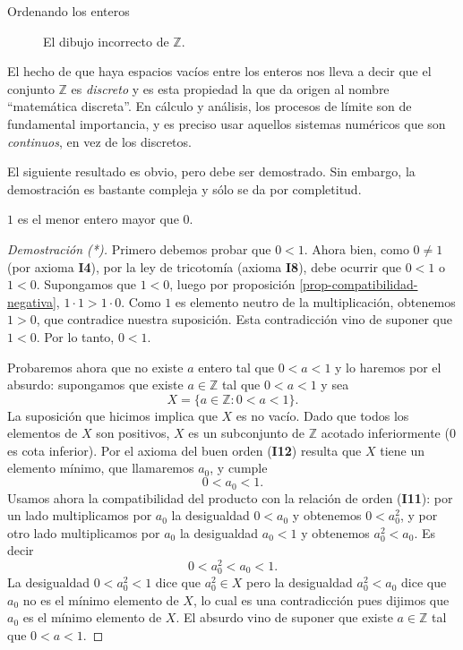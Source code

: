 \begin{section}{Ordenando los enteros}
\begin{figure}[ht]    
    \begin{center}
    \end{center}
    \caption{El dibujo incorrecto de $\mathbb Z$.}\label{f1.3}
\end{figure}

El hecho de que haya espacios vacíos entre los enteros nos lleva a decir que el conjunto $\mathbb Z$ es \textit{discreto} y es esta propiedad la que da origen al nombre ``matemática discreta''. En cálculo y análisis, los procesos de límite son de fundamental importancia, y es preciso usar aquellos sistemas numéricos que son \textit{continuos}, en vez de los discretos.

El siguiente resultado es obvio, pero  debe ser demostrado. Sin embargo,  la demostración es bastante compleja y sólo se da por completitud. 
\begin{proposicion}\label{prop-0-menor-que-1}
$1$ es el menor entero mayor que $0$.
\end{proposicion}
\begin{proof}[Demostración (*)] Primero debemos probar que $0 < 1$. Ahora bien, como $0 \not= 1$ (por axioma \textbf{I4}), por la ley de tricotomía (axioma \textbf{I8}), debe ocurrir que $0 < 1$ o $ 1 < 0$. Supongamos que $1 < 0$, luego por proposición \ref{prop-compatibilidad-negativa}, $1 \cdot 1 > 1 \cdot 0$. Como $1$  es elemento neutro de la multiplicación, obtenemos $1 > 0$, que contradice nuestra suposición. Esta contradicción vino de suponer que $1 < 0$. Por lo tanto, $0 < 1$.

Probaremos ahora que no existe $a$ entero tal que $ 0<a<1$ y lo haremos por el absurdo: supongamos que existe $a \in \mathbb Z$ tal que $0<a<1$ y sea 
$$
X=\{a\in\mathbb Z: 0<a<1\}.
$$
La  suposición que hicimos implica que $X$ es no vacío.  Dado que todos los elementos de $X$ son positivos, $X$ es un subconjunto de $\mathbb Z$ acotado inferiormente ($0$ es cota inferior). Por el axioma del buen orden (\textbf{I12}) resulta que $X$ tiene un elemento mínimo, que llamaremos $a_0$, y cumple
$$
0<a_0<1. 
$$
Usamos ahora la compatibilidad del  producto con  la relación de orden (\textbf{I11}):  por un lado multiplicamos por $a_0$ la desigualdad $0<a_0$ y obtenemos $0<a_0^2$,  y por otro lado multiplicamos por $a_0$ la desigualdad $a_0<1$ y obtenemos $a_0^2<a_0$. Es decir
$$
 0<a_0^2<a_0<1.
$$
La desigualdad $0<a_0^2<1$ dice que $a_0^2\in X$ pero la desigualdad $a_0^2<a_0$ dice que  $a_0$ no es el mínimo elemento de $X$, lo cual es una contradicción pues dijimos que $a_0$ es el mínimo elemento de $X$.  El  absurdo  vino de suponer que existe $a \in \mathbb Z$ tal que   $0<a<1$.
\end{proof}



\end{section}
